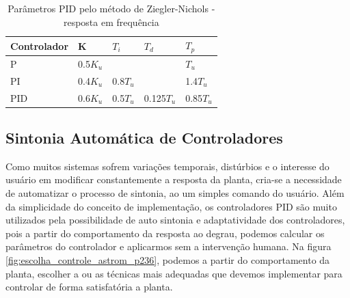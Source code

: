 \begin{table}
  \caption{Parâmetros PID pelo método de Ziegler-Nichols - resposta em frequência}
  \label{tab:Ziegler-Nichols-freq}
  \centering%
  \begin{minipage}{.52\textwidth}
    \begin{tabular*}{\textwidth}{lllll}
      \hline
      {Controlador} & {K} & {$T_i$} & {$T_d$}& {$T_p$}\\ \hline
      \hline
      P    &  0.5$K_u$   &           &             & $T_u$  \\ 
      PI   &  0.4$K_u$   & 0.8$T_u$  &             & 1.4$T_u$ \\
      PID  &  0.6$K_u$   & 0.5$T_u$  & 0.125$T_u$  & 0.85$T_u$  \\ \hline
    \end{tabular*}
  \end{minipage}
\end{table}



\subsection{Sintonia Automática de Controladores}

Como muitos sistemas sofrem variações temporais, distúrbios e o interesse do usuário em modificar constantemente a resposta da planta, cria-se a necessidade de automatizar o processo de sintonia, ao um simples comando do usuário. Além da simplicidade do conceito de implementação, os controladores PID são muito utilizados pela possibilidade de auto sintonia e adaptatividade dos controladores, pois a partir do comportamento da resposta ao degrau, podemos calcular os parâmetros do controlador e aplicarmos sem a intervenção humana\cite{Astrom1995}. Na figura \ref{fig:escolha_controle_astrom_p236}, podemos a partir do comportamento da planta, escolher a ou as técnicas mais adequadas que devemos implementar para controlar de forma satisfatória a planta.


